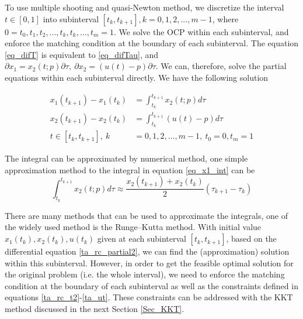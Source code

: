 \documentclass  [
  paper    = a4,
  BCOR     = 10mm,
  twoside,
  fontsize = 12pt,
  fleqn,
  toc      = bibnumbered,
  toc      = listofnumbered,
  numbers  = noendperiod,
  headings = normal,
  listof   = leveldown,
  version  = 3.03
]                                       {scrreprt}
\newcommand{\<}{\langle}
\renewcommand{\>}{\rangle}
\begin{document}
   To use multiple shooting and quasi-Newton method, we discretize the interval $t\in [0,1]$ into subinterval $[t_{k}, t_{k+1}], k = 0, 1, 2, ..., m-1$, where $0 = t_0, t_1, t_2, ...,t_k, t_k, ..., t_m = 1$. We solve the OCP within each subinterval, and enforce the matching condition at the boundary of each subinterval. The equation \ref{eq_difT} is equivalent to \ref{eq_difTau}, and $\partial x_1= x_2(t;p) \partial \tau, \ \partial x_2 = ( u(t)-p) \partial \tau$. We can, therefore, solve the partial equations within each subinterval directly. We have the following solution
   
   \begin{subequations}
	\begin{align}
      x_1(t_{k+1}) -  x_1(t_k)  &= \int_{t_k}^{t_{k+1}} x_2(t;p) d \tau \label{eq_x1_int} \\
      x_2(t_{k+1}) -  x_2(t_k)  &= \int_{t_k}^{t_{k+1}} (u(t)-p) d \tau \\
      t \in [t_{k}, t_{k+1}], \  k &= 0, 1, 2, ..., m-1, \  t_0 =0, t_m =1
   	\end{align}
\end{subequations}

The integral can be approximated by numerical method, one simple approximation method to the integral in equation \ref{eq_x1_int} can be 
\begin{equation}
\int_{t_k}^{t_{k+1}} x_2(t;p) d \tau  \approx \frac{x_2(t_{k+1}) + x_2(t_k)}{2} (\tau_{k+1} -\tau_k)
\label{mid_approx}
\end{equation}

There are many methods that can be used to approximate the integrals, one of the widely used method is the Runge–Kutta method. With initial value $x_1(t_k),x_2(t_k), u(t_k)$ given at each subinterval $[t_{k}, t_{k+1}]$, based on the differential equation \ref{ta_rc_partial2}, we can find the (approximation) solution within this subinterval. 
However, in order to get the feasible optimal solution for the original problem (i.e. the whole interval), we need to enforce the matching condition at the boundary of each subinterval as well as the constraints defined in equations \ref{ta_rc_t2}-\ref{ta_ut}.  These constraints can be addressed with the KKT method discussed in the next Section \ref{Sec_KKT}.
\end{document}
